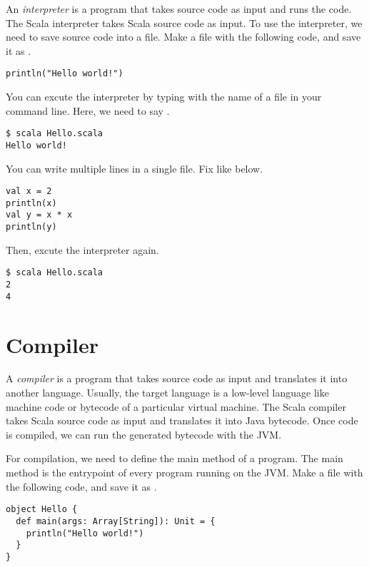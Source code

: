 An \textit{interpreter} is a program that takes source code as input and runs the code.
The Scala interpreter takes Scala source code as input. To use the interpreter,
we need to save source code into a file. Make a file with the following code, and
save it as .

\begin{verbatim}
println("Hello world!")
\end{verbatim}

You can excute the interpreter by typing  with the name of a file in
your command line. Here, we need to say .

\begin{verbatim}
$ scala Hello.scala
Hello world!
\end{verbatim}

You can write multiple lines in a single file. Fix  like
below.

\begin{verbatim}
val x = 2
println(x)
val y = x * x
println(y)
\end{verbatim}

Then, excute the interpreter again.

\begin{verbatim}
$ scala Hello.scala
2
4
\end{verbatim}

\section{Compiler}

A \textit{compiler} is a program that takes source code as input and translates it into
another language. Usually, the target language is a low-level language like
machine code or bytecode of a particular virtual machine.
The Scala compiler takes Scala source code as input and translates it into Java
bytecode. Once code is compiled, we can run the generated bytecode with the JVM.

For compilation, we need to define the main method of a program. The main method
is the entrypoint of every program running on the JVM.
Make a file with the following code, and save it as .

\begin{verbatim}
object Hello {
  def main(args: Array[String]): Unit = {
    println("Hello world!")
  }
}
\end{verbatim}

